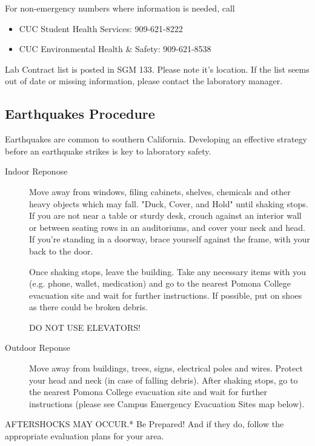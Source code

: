\documentclass[12pt]{../../cls/SOP4_alpha}\usepackage[]{graphicx}\usepackage[]{xcolor}
\begin{document}
\NP For non-emergency numbers where information is needed, call 
 
\begin{itemize}
  \item CUC Student Health Services: 909-621-8222
  \item CUC Environmental Health \& Safety: 909-621-8538 
\end{itemize}

\NP Lab Contract list is posted in SGM 133. Please note it's location. If the list seems out of date or missing information, please contact the laboratory manager.

\subsection*{Earthquakes Procedure} 

\NP Earthquakes are common to southern California. Developing an effective strategy before an earthquake strikes is key to laboratory safety.

\begin{description}
  \item[Indoor Reponose] Move away from windows, filing cabinets, shelves, chemicals and other heavy objects which may fall. "Duck, Cover, and Hold" until shaking stops. If you are not near a table or sturdy desk, crouch against an interior wall or between seating rows in an auditoriums, and cover your neck and head. If you’re standing in a doorway, brace yourself against the frame, with your back to the door.

Once shaking stops, leave the building. Take any necessary items with you (e.g. phone, wallet, medication) and go to the nearest Pomona College evacuation site and wait for further instructions. If possible, put on shoes as there could be broken debris. 

DO NOT USE ELEVATORS!

\item[Outdoor Reponse] Move away from buildings, trees, signs, electrical poles and wires.
Protect your head and neck (in case of falling debris).
After shaking stops, go to the nearest Pomona College evacuation site and wait for further instructions (please see Campus Emergency Evacuation Sites map below).

\end{description}
	
\NP *AFTERSHOCKS MAY OCCUR.* Be Prepared! And if they do, follow the appropriate evaluation plans for your area.
\end{document}
